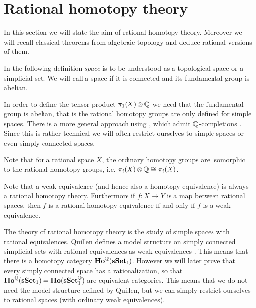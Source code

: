 
\chapter{Rational homotopy theory}
\label{sec:basics}

In this section we will state the aim of rational homotopy theory. Moreover we will recall classical theorems from algebraic topology and deduce rational versions of them.

In the following definition \emph{space} is to be understood as a topological space or a simplicial set. We will call a space  if it is connected and its fundamental group is abelian.



In order to define the tensor product $\pi_1(X) \operatorname*{\otimes} \mathbb{Q}$ we need that the fundamental group is abelian, that is the rational homotopy groups are only defined for simple spaces. There is a more general approach using , which admit $\mathbb{Q}$-completions \cite{bousfield}. Since this is rather technical we will often restrict ourselves to simple spaces or even simply connected spaces.

Note that for a rational space $X$, the ordinary homotopy groups are isomorphic to the rational homotopy groups, i.e. $\pi_i(X) \operatorname*{\otimes} \mathbb{Q} \cong \pi_i(X)$.



Note that a weak equivalence (and hence also a homotopy equivalence) is always a rational homotopy theory. Furthermore if $f: X \to Y$ is a map between rational spaces, then $f$ is a rational homotopy equivalence if and only if $f$ is a weak equivalence.

The theory of rational homotopy theory is the study of simple spaces with rational equivalences. Quillen defines a model structure on simply connected simplicial sets with rational equivalences as weak equivalences \cite{Quillen}. This means that there is a homotopy category $\mathbf{Ho}^{\mathbb{Q}}(\mathbf{s{\mathbf{Set}}}_1)$. However we will later prove that every simply connected space has a rationalization, so that $\mathbf{Ho}^{\mathbb{Q}}(\mathbf{s{\mathbf{Set}}}_1) = \mathbf{Ho}(\mathbf{s{\mathbf{Set}}}^{\mathbb{Q}}_1)$ are equivalent categories. This means that we do not need the model structure defined by Quillen, but we can simply restrict ourselves to rational spaces (with ordinary weak equivalences).


